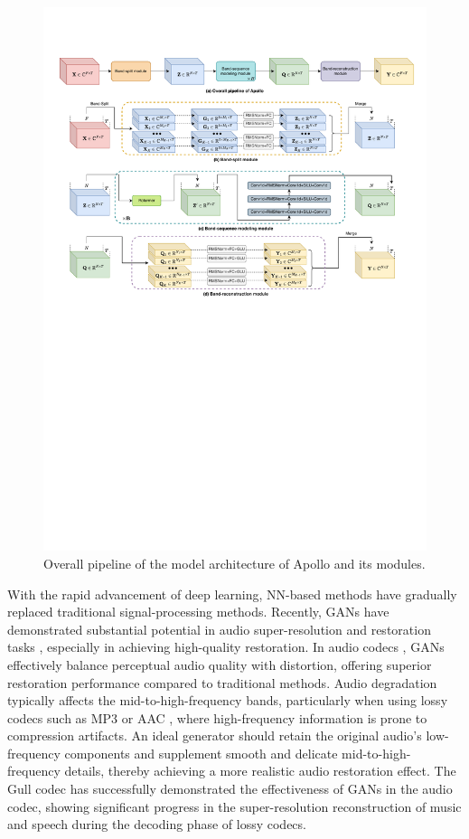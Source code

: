 \begin{figure}[h]
	\small
	\centering
	\includegraphics[width=2.0\columnwidth]{Figures/refiner.pdf}
	\caption{Overall pipeline of the model architecture of Apollo and its modules.}
	\label{fig:refiner}
\end{figure}

With the rapid advancement of deep learning, NN-based methods have gradually replaced traditional signal-processing methods. Recently, GANs \cite{goodfellow2020generative} have demonstrated substantial potential in audio super-resolution and restoration tasks \cite{lattner2021stochastic,pascual2017segan}, especially in achieving high-quality restoration. In audio codecs \cite{wu2023audiodec,kumar2024high,luo2024gull}, GANs effectively balance perceptual audio quality with distortion, offering superior restoration performance compared to traditional methods. Audio degradation typically affects the mid-to-high-frequency bands, particularly when using lossy codecs such as MP3 or AAC \cite{brandenburg1999mp3}, where high-frequency information is prone to compression artifacts. An ideal generator should retain the original audio's low-frequency components and supplement smooth and delicate mid-to-high-frequency details, thereby achieving a more realistic audio restoration effect. The Gull codec \cite{luo2024gull} has successfully demonstrated the effectiveness of GANs in the audio codec, showing significant progress in the super-resolution reconstruction of music and speech during the decoding phase of lossy codecs.

